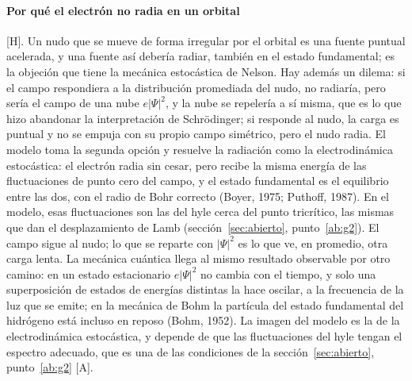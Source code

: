 \documentclass[11pt,a4paper]{article}
\newcommand{\st}[1]{\textup{[#1]}}
\newcommand{\apartado}[1]{\paragraph{#1}}
\begin{document}
\apartado{Por qué el electrón no radia en un orbital} \st{H}. Un nudo que se mueve de forma irregular por el orbital es una fuente puntual acelerada, y una fuente así debería radiar, también en el estado fundamental; es la objeción que tiene la mecánica estocástica de Nelson. Hay además un dilema: si el campo respondiera a la distribución promediada del nudo, no radiaría, pero sería el campo de una nube $e|\Psi|^2$, y la nube se repelería a sí misma, que es lo que hizo abandonar la interpretación de Schrödinger; si responde al nudo, la carga es puntual y no se empuja con su propio campo simétrico, pero el nudo radia. El modelo toma la segunda opción y resuelve la radiación como la electrodinámica estocástica: el electrón radia sin cesar, pero recibe la misma energía de las fluctuaciones de punto cero del campo, y el estado fundamental es el equilibrio entre las dos, con el radio de Bohr correcto (Boyer, 1975; Puthoff, 1987). En el modelo, esas fluctuaciones son las del hyle cerca del punto tricrítico, las mismas que dan el desplazamiento de Lamb (sección~\ref{sec:abierto}, punto~\ref{ab:g2}). El campo sigue al nudo; lo que se reparte con $|\Psi|^2$ es lo que ve, en promedio, otra carga lenta. La mecánica cuántica llega al mismo resultado observable por otro camino: en un estado estacionario $e|\Psi|^2$ no cambia con el tiempo, y solo una superposición de estados de energías distintas la hace oscilar, a la frecuencia de la luz que se emite; en la mecánica de Bohm la partícula del estado fundamental del hidrógeno está incluso en reposo (Bohm, 1952). La imagen del modelo es la de la electrodinámica estocástica, y depende de que las fluctuaciones del hyle tengan el espectro adecuado, que es una de las condiciones de la sección~\ref{sec:abierto}, punto~\ref{ab:g2} \st{A}.
\end{document}
